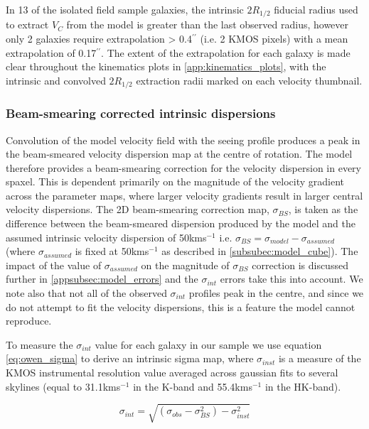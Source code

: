 \documentclass[fleqn,usenatbib]{mn2e}
\begin{document}
In 13 of the isolated field sample galaxies, the intrinsic $2R_{1/2}$ fiducial radius used to extract $V_{C}$ from the model is greater than the last observed radius, however only 2 galaxies require extrapolation > 0.4$^{\prime\prime}$ (i.e. 2 KMOS pixels) with a mean extrapolation of 0.17$^{\prime\prime}$.
The extent of the extrapolation for each galaxy is made clear throughout the kinematics plots in \cref{app:kinematics_plots}, with the intrinsic and convolved $2R_{1/2}$ extraction radii marked on each velocity thumbnail.

\subsubsection{Beam-smearing corrected intrinsic dispersions}\label{subsubsec:beam_smearing_corrected_dispersions}
Convolution of the model velocity field with the seeing profile produces a peak in the beam-smeared velocity dispersion map at the centre of rotation.
The model therefore provides a beam-smearing correction for the velocity dispersion in every spaxel.
This is dependent primarily on the magnitude of the velocity gradient across the parameter maps, where larger velocity gradients result in larger central velocity dispersions.
The 2D beam-smearing correction map, $\sigma_{BS}$, is taken as the difference between the beam-smeared dispersion produced by the model and the assumed intrinsic velocity dispersion of 50kms$^{-1}$ i.e. $\sigma_{BS} = \sigma_{model} - \sigma_{assumed}$ (where $\sigma_{assumed}$ is fixed at 50kms$^{-1}$ as described in \cref{subsubec:model_cube}).
The impact of the value of $\sigma_{assumed}$ on the magnitude of $\sigma_{BS}$ correction is discussed further in \cref{appsubsec:model_errors} and the $\sigma_{int}$ errors take this into account.
We note also that not all of the observed $\sigma_{int}$ profiles peak in the centre, and since we do not attempt to fit the velocity dispersions, this is a feature the model cannot reproduce. 

To measure the $\sigma_{int}$ value for each galaxy in our sample we use equation \ref{eq:owen_sigma} to derive an intrinsic sigma map, where $\sigma_{inst}$ is a measure of the KMOS instrumental resolution value averaged across gaussian fits to several skylines (equal to 31.1kms$^{-1}$ in the K-band and 55.4kms$^{-1}$ in the HK-band).

\begin{equation}\label{eq:owen_sigma}
\sigma_{int} = \sqrt{\left(\sigma_{obs} - \sigma_{BS}^{2}\right) - \sigma_{inst}^{2}}
\end{equation}
\end{document}
